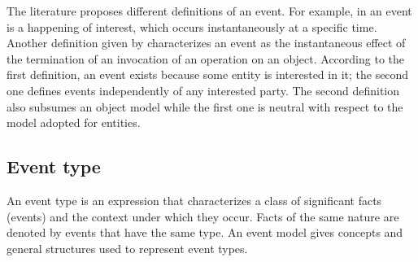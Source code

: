  The literature proposes different definitions of an event. For example, in \cite{Mansouri97gem} an event is a happening of interest, which occurs instantaneously at a specific time. Another definition given by \cite{Rosenblum97} characterizes an event as the instantaneous effect of the termination of an invocation of an operation on an object. According to the first definition, an event exists because some entity is interested in it; the second one defines events independently of any interested party. The second definition also subsumes an object model while the first one is neutral with respect to the model adopted for entities. 
% 
 
 \subsection{Event type}
 An event type is an expression that characterizes a class of significant facts (events) and the context under which they occur. Facts of the same nature are denoted by events that have the same type. 
 An event model gives concepts and general structures used to represent event types.  
 
